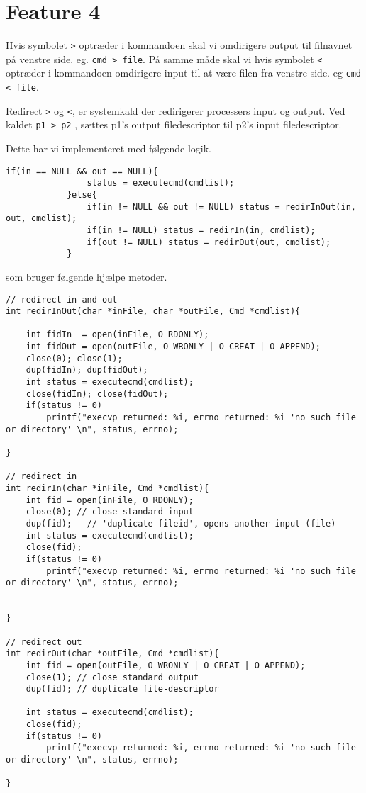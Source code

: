 \documentclass[danish]{report}
\begin{document}
\section{Feature 4}

Hvis symbolet {\tt >} optræder i kommandoen skal vi omdirigere output til filnavnet på venstre side. eg. {\tt cmd > file}. På samme måde skal vi hvis symbolet {\tt <} optræder i kommandoen omdirigere input til at være filen fra venstre side. eg {\tt cmd < file}. 

Redirect {\tt >} og {\tt <}, er systemkald der redirigerer processers input og output. Ved kaldet {\tt p1 > p2} , sættes p1's output filedescriptor til p2's input  filedescriptor.       

Dette har vi implementeret med følgende logik.

\begin{lstlisting}
if(in == NULL && out == NULL){
                status = executecmd(cmdlist);
            }else{
                if(in != NULL && out != NULL) status = redirInOut(in, out, cmdlist);
                if(in != NULL) status = redirIn(in, cmdlist);
                if(out != NULL) status = redirOut(out, cmdlist);
            }
\end{lstlisting}

som bruger følgende hjælpe metoder.

\begin{lstlisting}
// redirect in and out
int redirInOut(char *inFile, char *outFile, Cmd *cmdlist){
    
    int fidIn  = open(inFile, O_RDONLY);
    int fidOut = open(outFile, O_WRONLY | O_CREAT | O_APPEND);              
    close(0); close(1);
    dup(fidIn); dup(fidOut);
    int status = executecmd(cmdlist);
    close(fidIn); close(fidOut);
    if(status != 0) 
        printf("execvp returned: %i, errno returned: %i 'no such file or directory' \n", status, errno);

}

// redirect in
int redirIn(char *inFile, Cmd *cmdlist){
    int fid = open(inFile, O_RDONLY);  
    close(0); // close standard input
    dup(fid);   // 'duplicate fileid', opens another input (file)    
    int status = executecmd(cmdlist);
    close(fid);             
    if(status != 0) 
        printf("execvp returned: %i, errno returned: %i 'no such file or directory' \n", status, errno);


}

// redirect out
int redirOut(char *outFile, Cmd *cmdlist){
    int fid = open(outFile, O_WRONLY | O_CREAT | O_APPEND);         
    close(1); // close standard output
    dup(fid); // duplicate file-descriptor

    int status = executecmd(cmdlist);
    close(fid);             
    if(status != 0) 
        printf("execvp returned: %i, errno returned: %i 'no such file or directory' \n", status, errno);

}
\end{lstlisting}
\end{document}
